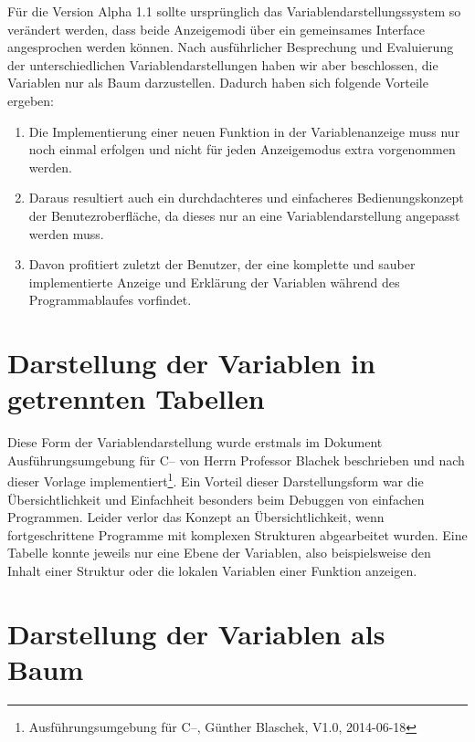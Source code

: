Für die Version Alpha 1.1 sollte ursprünglich das Variablendarstellungssystem so verändert werden, dass beide Anzeigemodi über ein gemeinsames Interface angesprochen werden können. Nach ausführlicher Besprechung und Evaluierung der unterschiedlichen Variablendarstellungen haben wir aber beschlossen, die Variablen nur als Baum darzustellen. Dadurch haben sich folgende Vorteile ergeben:
\begin{enumerate}
\item Die Implementierung einer neuen Funktion in der Variablenanzeige muss nur noch einmal erfolgen und nicht für jeden Anzeigemodus extra vorgenommen werden.
\item Daraus resultiert auch ein durchdachteres und einfacheres Bedienungskonzept der Benutezroberfläche, da dieses nur an eine Variablendarstellung angepasst werden muss.
\item Davon profitiert zuletzt der Benutzer, der eine komplette und sauber implementierte Anzeige und Erklärung der Variablen während des Programmablaufes vorfindet.
\end{enumerate}

\section{Darstellung der Variablen in getrennten Tabellen}

Diese Form der Variablendarstellung wurde erstmals im Dokument Ausführungsumgebung für C-- von Herrn Professor Blachek beschrieben und nach dieser Vorlage implementiert\footnote{Ausführungsumgebung für C--, Günther Blaschek, V1.0, 2014-06-18}. Ein Vorteil dieser Darstellungsform war die Übersichtlichkeit und Einfachheit besonders beim Debuggen von einfachen Programmen. Leider verlor das Konzept an Übersichtlichkeit, wenn fortgeschrittene Programme mit komplexen Strukturen abgearbeitet wurden. Eine Tabelle konnte jeweils nur eine Ebene der Variablen, also beispielsweise den Inhalt einer Struktur oder die lokalen Variablen einer Funktion anzeigen.

\section{Darstellung der Variablen als Baum}

